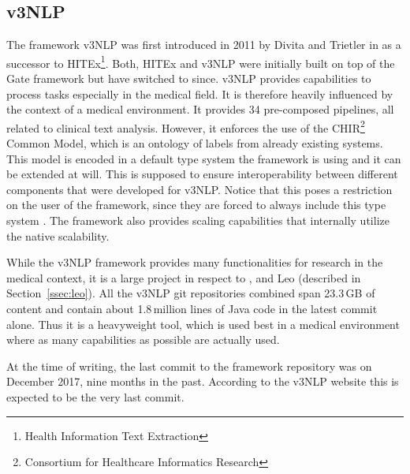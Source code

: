 \subsection{v3NLP}
The framework v3NLP was first introduced in 2011 by Divita and Trietler in \cite{divita2011finding} as a successor to HITEx\footnote{Health Information Text Extraction}. Both, HITEx and v3NLP were initially built on top of the Gate framework but have switched to \uima{} since. v3NLP provides capabilities to process \nlp{} tasks especially in the medical field. It is therefore heavily influenced by the context of a medical environment. It provides 34 pre-composed pipelines, all related to clinical text analysis. However, it enforces the use of the CHIR\footnote{Consortium for Healthcare Informatics Research} Common Model, which is an ontology of labels from already existing \nlp{} systems. This model is encoded in a default type system the framework is using and it can be extended at will. This is supposed to ensure interoperability between different \nlp{} components that were developed for v3NLP. Notice that this poses a restriction on the user of the framework, since they are forced to always include this type system \cite{divita2016v3nlp}. The framework also provides scaling capabilities that internally utilize the native \uimaas{} scalability.

While the v3NLP framework provides many functionalities for \nlp{} research in the medical context, it is a large project in respect to \uima{}, \uimaas{} and Leo (described in Section~\ref{ssec:leo}). All the v3NLP git repositories combined span 23.3\,GB of content and contain about 1.8\,million lines of Java code in the latest commit alone. Thus it is a heavyweight tool, which is used best in a medical environment where as many capabilities as possible are actually used.

At the time of writing, the last commit to the framework repository was on December 2017, nine months in the past. According to the v3NLP website this is expected to be the very last commit.





% 
% 
% 
